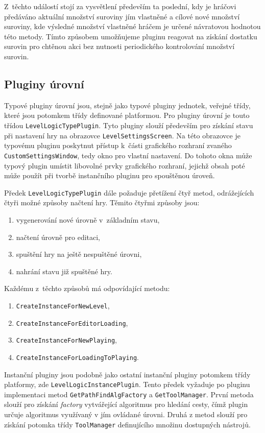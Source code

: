 Z~těchto událostí stojí za vysvětlení především ta poslední, kdy je hráčovi předáváno aktuální množství suroviny jím vlastněné a  cílové nové množství suroviny, kde výsledné množství vlastněné hráčem je určené návratovou hodnotou této metody. Tímto způsobem umožňujeme pluginu reagovat na získání dostatku surovin pro chtěnou akci bez nutnosti periodického kontrolování množství surovin.

\subsection{Pluginy úrovní}
Typové pluginy úrovní jsou, stejně jako typové pluginy jednotek, veřejné třídy, které jsou potomkem třídy definované platformou. Pro pluginy úrovní je touto třídou \texttt{LevelLogicTypePlugin}. Tyto pluginy slouží především pro získání stavu při nastavení hry na obrazovce \texttt{LevelSettingsScreen}. Na této obrazovce je typovému pluginu poskytnut přístup k~části grafického rozhraní zvaného \texttt{CustomSettingsWindow}, tedy okno pro vlastní nastavení. Do tohoto okna může typový plugin umístit libovolné prvky grafického rozhraní, jejichž obsah poté může použít při tvorbě instančního pluginu pro spouštěnou úroveň.

Předek \texttt{LevelLogicTypePlugin} dále požaduje přetížení čtyř metod, odrážejících čtyři možné způsoby načtení hry. Těmito čtyřmi způsoby jsou:

\begin{enumerate}
	\item vygenerování nové úrovně v~základním stavu,
	\item načtení úrovně pro editaci,
	\item spuštění hry na ještě nespuštěné úrovni,
	\item nahrání stavu již spuštěné hry.
\end{enumerate}

Každému z~těchto způsobů má odpovídající metodu:
\begin{enumerate}
	\item \texttt{CreateInstanceForNewLevel},
	\item \texttt{CreateInstanceForEditorLoading},
	\item \texttt{CreateInstanceForNewPlaying},
	\item \texttt{CreateInstanceForLoadingToPlaying}.
\end{enumerate}

Instanční pluginy jsou podobně jako ostatní instanční pluginy potomkem třídy platformy, zde \texttt{LevelLogicInstancePlugin}. Tento předek vyžaduje po pluginu implementaci metod \texttt{GetPathFindAlgFactory} a \texttt{GetToolManager}. První metoda slouží pro získání \textit{factory} vytvářející algoritmus pro hledání cesty, čímž plugin určuje algoritmus využívaný v jím ovládané úrovni. Druhá z metod slouží pro získání potomka třídy \texttt{ToolManager} definujícího množinu dostupných nástrojů. 


